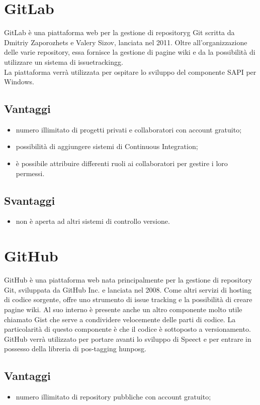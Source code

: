 \section{GitLab}
GitLab è una piattaforma web per la gestione di \gls{repositoryg} Git scritta da Dmitriy Zaporozhets e Valery Sizov, lanciata nel 2011. Oltre all'organizzazione delle varie repository, essa fornisce la gestione di pagine wiki e da la possibilità di utilizzare un sistema di \gls{issuetrackingg}.\\
La piattaforma verrà utilizzata per ospitare lo sviluppo del componente SAPI per Windows.
\subsection*{Vantaggi}
\begin{itemize}
	\item numero illimitato di progetti privati e collaboratori con account gratuito;
	\item possibilità di aggiungere sistemi di Continuous Integration;
	\item è possibile attribuire differenti ruoli ai collaboratori per gestire i loro permessi.
\end{itemize}
\subsection*{Svantaggi}
\begin{itemize}
	\item non è aperta ad altri sistemi di controllo versione.
\end{itemize}
\section{GitHub}
GitHub è una piattaforma web nata principalmente per la gestione di repository Git, sviluppata da GitHub Inc. e lanciata nel 2008. Come altri servizi di hosting di codice sorgente, offre uno strumento di issue tracking e la possibilità di creare pagine wiki. Al suo interno è presente anche un altro componente molto utile chiamato Gist che serve a condividere velocemente delle parti di codice. La particolarità di questo componente è che il codice è sottoposto a versionamento.\\
GitHub verrà utilizzato per portare avanti lo sviluppo di Speect e per entrare in possesso della libreria di pos-tagging \gls{hunposg}.
\subsection*{Vantaggi}
\begin{itemize}
	\item numero illimitato di repository pubbliche con account gratuito;
\end{itemize}
